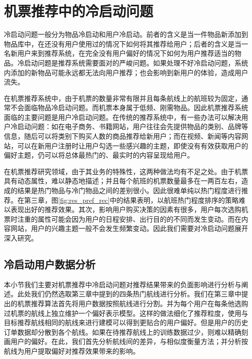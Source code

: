 
\chapter{机票推荐中的冷启动问题}
\label{chap:cold}

冷启动问题一般分为物品冷启动和用户冷启动。前者的含义是当一件物品新添加到物品库中，在还没有用户使用过的情况下如何将其推荐给用户；后者的含义是当一名新用户来到推荐系统，在完全没有用户偏好的情况下如何为用户推荐适当的物品。冷启动问题是推荐系统需要面对的严峻问题。如果处理不好冷启动问题，系统内添加的新物品可能永远都无法向用户推荐；也会影响到新用户的体验，造成用户流失。\par
在机票推荐系统中，由于机票的数量非常有限并且每条航线上的航班较为固定，通常不会面临物品冷启动问题。而机票本身属于低频、刚需物品。因此机票推荐系统面临的主要问题是用户冷启动问题。在传统的推荐系统中，有一些办法可以解决用户冷启动问题：如在电子商务、书籍网站，用户往往会先提供物品的类别、品牌等信息，随后可以将类别下购买人数的商品推荐给新用户；而在视频、新闻等内容网站，可以在新用户注册时让用户勾选一些感兴趣的主题，即使没有有效获取用户的偏好主题，仍可以将总体最热门的、最实时的内容呈现给用户。\par
在机票推荐研究领域，由于其业务的特殊性，这两种做法均有不足之处。由于机票具有动态属性，难以静态地描述；并且每个航班的机票数量最多在一两百左右，造成的结果是热门物品与冷门物品之间的差别很小。因此很难单纯以热门程度进行推荐。在第三章，图\ref{fig:res_pref_rec}中的结果表明，以航班热门程度排序的策略难以表现出好的推荐效果。其次，影响用户购买决策的因素有很多，用户每次选购机票时注重的属性可能会因为用户的日程安排、出行目的的不同而发生变动。而在内容网站，用户的兴趣主题一般不会发生频繁变动。因此我们需要对冷启动问题展开深入研究。


\section{冷启动用户数据分析}
本小节我们主要对机票推荐中冷启动问题对推荐结果带来的负面影响进行分析与阐述。此处我们仍然选取第三章中提到的四条热门航线进行分析。我们在第三章中提出的机票推荐算法首先将用户数据按照航线进行分割。并为每个用户在每条他选购过机票的航线上独立维护一个偏好表示模型。这样的做法细化了推荐粒度，使用与目标推荐航线相同的航线来进行建模可以得到更贴合的用户偏好。但是用户的历史订单数据却分散到各个航线。如果在待推荐航线上的训练数据过少，则难以精确刻画用户的偏好。在此，我们首先分析航线间的差异，与相似度衡量方法；并分析按航线为用户提取偏好对推荐效果带来的影响。

